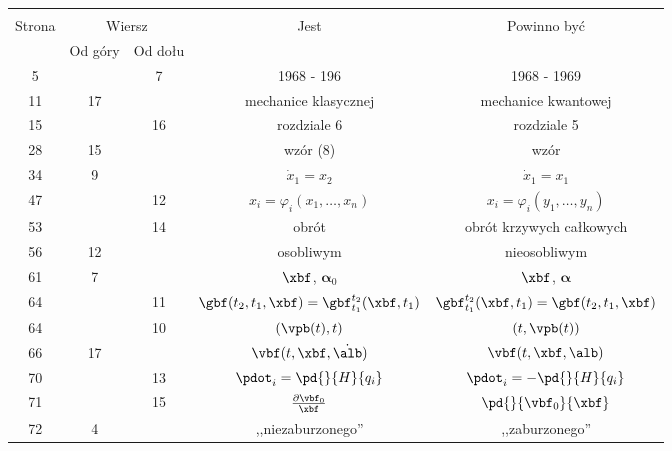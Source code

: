 \documentclass[a4paper,11pt]{article}
\begin{document}




\begin{center}
  \begin{tabular}{|c|c|c|c|c|}
    \hline
    & \multicolumn{2}{c|}{} & & \\
    Strona & \multicolumn{2}{c|}{Wiersz} & Jest
                              & Powinno być \\ \cline{2-3}
    & Od góry & Od dołu & & \\
    \hline
    5   & &  7 & 1968 - 196 & 1968 - 1969 \\
    11  & 17 & & mechanice klasycznej & mechanice kwantowej \\
    15  & & 16 & rozdziale 6 & rozdziale 5 \\
    28  & 15 & & wzór (8) & wzór \\
    34  &  9 & & $\dot{ x }_{ 1 } = x_{ 2 }$ & $\dot{ x }_{ 1 } = x_{ 1 }$ \\
    47  & & 12 & $x_{ i } = \varphi_{ i }( x_{ 1 }, \ldots, x_{ n } )$
           & $x_{ i } = \varphi_{ i }( y_{ 1 }, \ldots, y_{ n } )$ \\
    53  & & 14 & obrót & obrót krzywych całkowych \\
    56  & 12 & & osobliwym & nieosobliwym \\
    61  &  7 & & $\xbf$, $\boldsymbol{\alpha}_{ 0 }$
           & $\xbf$, $\boldsymbol{\alpha}$ \\
    64  & & 11 & $\gbf( t_{ 2 }, t_{ 1 }, \xbf )
                = \gbf^{ t_{ 2 } }_{ t_{ 1 } }( \xbf, t_{ 1 } )$
           & $\gbf^{ t_{ 2 } }_{ t_{ 1 } }( \xbf, t_{ 1 } )
             = \gbf( t_{ 2 }, t_{ 1 }, \xbf )$ \\
    64  & & 10 & $( \vpb( t ), t )$ & $( t, \vpb( t ) )$ \\
    66  & 17 & & $\vbf( t, \xbf, \dot{ \alb } )$
           & $\vbf( t, \xbf, \alb )$ \\
    70  & & 13 & $\pdot_{ i } = \pd{ }{ H }{ q_{ i } }$
           & $\pdot_{ i } = -\pd{ }{ H }{ q_{ i } }$ \\
    71  & & 15 & $\frac{ \partial \vbf_{ 0 } }{ \xbf }$
           & $\pd{}{ \vbf_{ 0 } }{ \xbf }$ \\
    72  &  4 & & ,,niezaburzonego'' & ,,zaburzonego'' \\

\end{tabular}
\end{center}
\end{document}

